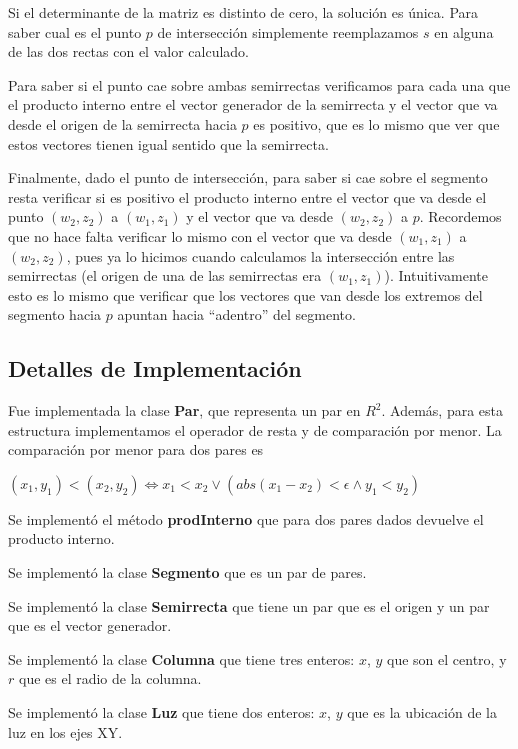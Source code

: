 Si el determinante de la matriz es distinto de cero, la solución es única. Para saber cual es el
punto $p$ de intersección simplemente reemplazamos $s$ en alguna de las dos rectas con el valor
calculado.

Para saber si el punto cae sobre ambas semirrectas verificamos para cada una que el producto
interno entre el vector generador de la semirrecta y el vector que va desde el origen de la
semirrecta hacia $p$ es positivo, que es lo mismo que ver que estos vectores tienen igual sentido
que la semirrecta.

Finalmente, dado el punto de intersección, para saber si cae sobre el segmento resta verificar si
es positivo el producto interno entre el vector que va desde el punto $(w_2, z_2)$ a $(w_1, z_1)$
y el vector que va desde $(w_2, z_2)$ a $p$. Recordemos que no hace falta verificar lo mismo con el
vector que va desde $(w_1, z_1)$ a $(w_2, z_2)$, pues ya lo hicimos cuando calculamos la
intersección entre las semirrectas (el origen de una de las semirrectas era $(w_1, z_1)$).
Intuitivamente esto es lo mismo que verificar que los vectores que van desde los extremos del
segmento hacia $p$ apuntan hacia ``adentro'' del segmento.

\subsection*{Detalles de Implementación}

Fue implementada la clase \textbf{Par}, que representa un par en $R^2$. Además, para esta
estructura implementamos el operador de resta y de comparación por menor. La comparación por menor
para dos pares es

\vspace{0.2cm}
$(x_1, y_1) < (x_2, y_2) \Leftrightarrow x_1 < x_2 \vee ( abs(x_1 - x_2) < \epsilon \wedge y_1 < y_2 )$
\vspace{0.2cm}

Se implementó el método \textbf{prodInterno} que para dos pares dados devuelve el producto interno.

Se implementó la clase \textbf{Segmento} que es un par de pares.

Se implementó la clase \textbf{Semirrecta} que tiene un par que es el origen y un par que es el 
vector generador.

Se implementó la clase \textbf{Columna} que tiene tres enteros: $x$, $y$ que son el centro, y $r$
que es el radio de la columna.

Se implementó la clase \textbf{Luz} que tiene dos enteros: $x$, $y$ que es la ubicación de la luz
en los ejes XY.

